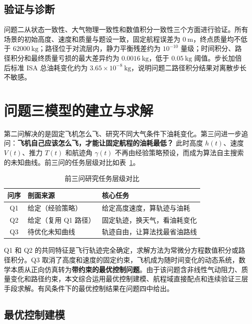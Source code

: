 \documentclass[withoutpreface,bwprint]{cumcmthesis}
\begin{document}
\subsection{验证与诊断}

问题二从状态一致性、大气物理一致性和数值积分一致性三个方面进行验证。所有场景的初始高度、速度和质量与题设一致，固定航程误差为 $0\ \mathrm{m}$，终点质量均不低于 $62000\ \mathrm{kg}$；路径位于对流层内，静力平衡残差约为 $10^{-10}$ 量级；时间积分、路径积分和最终质量亏损的最大差异约为 $0.0016\ \mathrm{kg}$，低于 $0.05\ \mathrm{kg}$ 阈值。步长加倍后标准 ISA 总油耗变化约为 $3.65\times10^{-8}\ \mathrm{kg}$，说明问题二路径积分结果对离散步长不敏感。

\section{问题三模型的建立与求解}

第二问解决的是固定飞机怎么飞、研究不同大气条件下油耗变化。第三问进一步追问：\textbf{飞机自己应该怎么飞，才能让固定航程的油耗最低？} 此时高度 $h(t)$、速度 $V(t)$、推力 $T(t)$ 和航迹角 $\gamma(t)$ 不再由经验策略预设，而成为算法自主搜索的未知曲线。前三问的任务层级对比如表~\ref{tab:q3_task_comparison}。

\begin{table}[H]
\centering\caption{前三问研究任务层级对比}
\label{tab:q3_task_comparison}
\begin{tabular}{cll}\toprule
问序 & 剖面来源 & 核心任务 \\ \midrule
Q1 & 给定（经验策略） & 给定高度速度，算轨迹与油耗 \\
Q2 & 给定（复用 Q1 路径） & 固定轨迹，换天气，看油耗变化 \\
Q3 & 待优化未知曲线 & 轨迹自由，让算法找最省油路线 \\ \bottomrule
\end{tabular}
\end{table}

Q1 和 Q2 的共同特征是飞行轨迹完全确定，求解方法为常微分方程数值积分或路径积分。Q3 取消了高度和速度的固定约束，飞机成为随时间变化的动态系统，数学本质从正向仿真转为\textbf{带约束的最优控制问题}\cite{kuang2012,chang2023}。由于该问题含非线性气动阻力、质量变化和路径约束，本文综合运用最优控制建模、航程域直接配点和连续验证三层手段求解\cite{jia2024,optimal_control2017}。有风条件下的最优控制结果在问题四中给出。

\subsection{最优控制建模}
\end{document}
